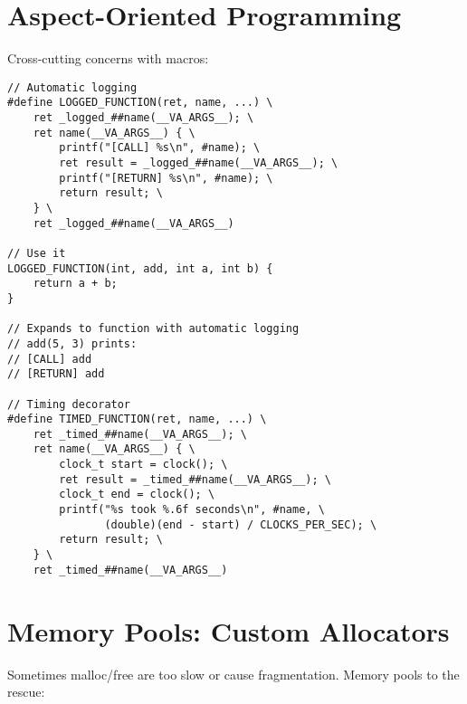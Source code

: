 \section{Aspect-Oriented Programming}

Cross-cutting concerns with macros:

\begin{lstlisting}
// Automatic logging
#define LOGGED_FUNCTION(ret, name, ...) \
    ret _logged_##name(__VA_ARGS__); \
    ret name(__VA_ARGS__) { \
        printf("[CALL] %s\n", #name); \
        ret result = _logged_##name(__VA_ARGS__); \
        printf("[RETURN] %s\n", #name); \
        return result; \
    } \
    ret _logged_##name(__VA_ARGS__)

// Use it
LOGGED_FUNCTION(int, add, int a, int b) {
    return a + b;
}

// Expands to function with automatic logging
// add(5, 3) prints:
// [CALL] add
// [RETURN] add

// Timing decorator
#define TIMED_FUNCTION(ret, name, ...) \
    ret _timed_##name(__VA_ARGS__); \
    ret name(__VA_ARGS__) { \
        clock_t start = clock(); \
        ret result = _timed_##name(__VA_ARGS__); \
        clock_t end = clock(); \
        printf("%s took %.6f seconds\n", #name, \
               (double)(end - start) / CLOCKS_PER_SEC); \
        return result; \
    } \
    ret _timed_##name(__VA_ARGS__)
\end{lstlisting}

\section{Memory Pools: Custom Allocators}

Sometimes malloc/free are too slow or cause fragmentation. Memory pools to the rescue:

